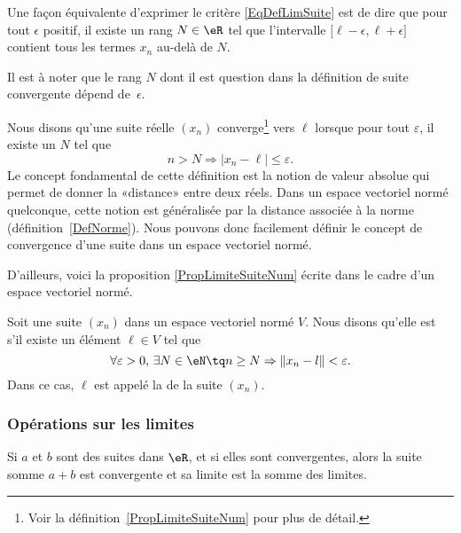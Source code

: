 Une façon équivalente d'exprimer le critère \eqref{EqDefLimSuite} est de dire que pour tout $\epsilon$ positif, il existe un rang $N\in\eR$ tel que l'intervalle $\mathopen[ \ell-\epsilon , \ell+\epsilon \mathclose]$ contient tous les termes $x_n$ au-delà de $N$.

Il est à noter que le rang $N$ dont il est question dans la définition de suite convergente dépend de~$\epsilon$.

Nous disons qu'une suite réelle $(x_n)$ converge\footnote{Voir la définition~\ref{PropLimiteSuiteNum} pour plus de détail.} vers $\ell$ lorsque pour tout $\varepsilon$, il existe un $N$ tel que
\begin{equation}
	n>N\Rightarrow | x_n-\ell |\leq\varepsilon.
\end{equation}
Le concept fondamental de cette définition est la notion de valeur absolue qui permet de donner la «distance» entre deux réels. Dans un espace vectoriel normé quelconque, cette notion est généralisée par la distance associée à la norme (définition~\ref{DefNorme}). Nous pouvons donc facilement définir le concept de convergence d'une suite dans un espace vectoriel normé.

D'ailleurs, voici la proposition \ref{PropLimiteSuiteNum} écrite dans le cadre d'un espace vectoriel normé.

\begin{definition}		\label{DefCvSuiteEGVN}
	Soit une suite $(x_n)$ dans un espace vectoriel normé $V$. Nous disons qu'elle est
     s'il existe un élément $\ell\in V$ tel que
	\begin{equation}
		\forall \varepsilon>0,\,\exists N\in\eN\tq n\geq N\Rightarrow \| x_n-l \|<\varepsilon.
	\end{equation}
	Dans ce cas, $\ell$ est appelé la  de la suite $(x_n)$.
\end{definition}


\subsubsection{Opérations sur les limites}

\begin{lemma}       \label{LEMooSFBLooKSXiyj}
    Si \( a\) et \( b\) sont des suites dans \( \eR\), et si elles sont convergentes, alors la suite somme \( a+b\) est convergente et sa limite est la somme des limites.
\end{lemma}

